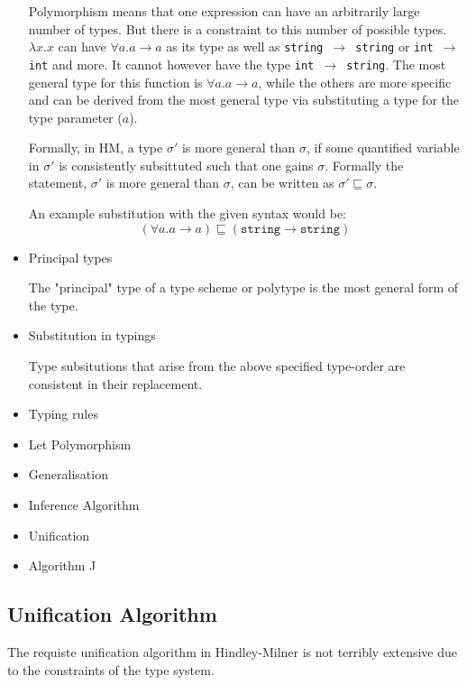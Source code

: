 \documentclass{l4proj}
\begin{document}
\begin{itemize}
    Polymorphism means that one expression can have an arbitrarily large number of types.
    But there is a constraint to this number of possible types.
    $\lambda x . x$ can have $\forall a . a \rightarrow a$ as its type as well as \texttt{string $\rightarrow$ string} or \texttt{int $\rightarrow$ int} and more.
    It cannot however have the type \texttt{int $\rightarrow$ string}.
    The most general type for this function is $\forall a . a \rightarrow a$, while the others are more specific and can be derived from the most general type via substituting a type for the type parameter ($a$).

    Formally, in HM, a type $\sigma ' $ is more general than $\sigma$, if some quantified variable in $\sigma'$ is consistently subsittuted such that one gains $\sigma$.
    Formally the statement, $\sigma ' $ is more general than $\sigma$, can be written as $\sigma' \sqsubseteq \sigma$.

    An example substitution with the given syntax would be:
    \[(\forall a . a \rightarrow a) \sqsubseteq (\texttt{string} \rightarrow \texttt{string})\]
    \item Principal types
    
    The "principal" type of a type scheme or polytype is the most general form of the type.
    \item Substitution in typings
    
    Type subsitutions that arise from the above specified type-order are consistent in their replacement.
    \item Typing rules
    \item Let Polymorphism
    \item Generalisation
    \item Inference Algorithm
    \item Unification 
    \item Algorithm J
    
\end{itemize}


    
    
\newpage

\newpage
\subsection{Unification Algorithm}

The requiste unification algorithm in Hindley-Milner is not terribly extensive due to the constraints of the type system.
\end{document}

